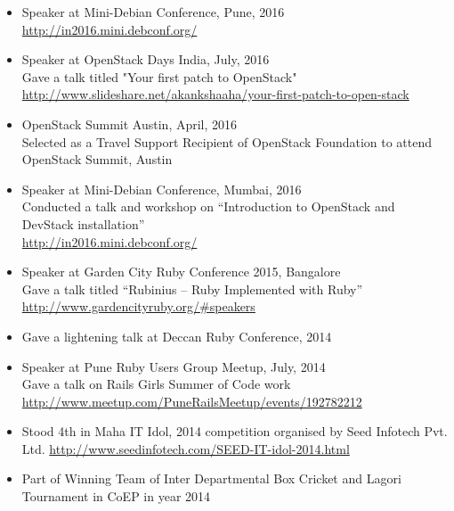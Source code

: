 \documentclass[margin,line]{res}
\begin{document}
\begin{resume}
\begin{itemize}
\item {Speaker at Mini-Debian Conference, Pune, 2016}\\
\url{http://in2016.mini.debconf.org/}\\

\item {Speaker at OpenStack Days India, July, 2016}\\
Gave a talk titled "Your first patch to OpenStack"\\
\url{http://www.slideshare.net/akankshaaha/your-first-patch-to-open-stack}\\

\item {OpenStack Summit Austin, April, 2016}\\
Selected as a Travel Support Recipient of OpenStack Foundation to attend OpenStack Summit, Austin\\
 
 \item {Speaker at Mini-Debian Conference, Mumbai, 2016}\\
Conducted a talk and workshop on “Introduction to OpenStack and DevStack installation”\\
 \url{http://in2016.mini.debconf.org/}\\
 
 \item {Speaker at Garden City Ruby Conference 2015, Bangalore}\\
 Gave a talk titled “Rubinius – Ruby Implemented with Ruby”\\
 \url{http://www.gardencityruby.org/#speakers}\\
 
 \item {Gave a lightening talk at Deccan Ruby Conference, 2014}\\
 
 \item {Speaker at Pune Ruby Users Group Meetup, July, 2014}\\
 Gave a talk on Rails Girls Summer of Code work\\
 \url{http://www.meetup.com/PuneRailsMeetup/events/192782212}\\
 
 \item {Stood 4th in Maha IT Idol, 2014 competition organised by Seed Infotech Pvt. Ltd.}
 \url{http://www.seedinfotech.com/SEED-IT-idol-2014.html}\\
 
 \item{Part of Winning Team of Inter Departmental Box Cricket and Lagori Tournament in CoEP in year 2014}\\


\end{itemize}
\end{resume}
\end{document}
